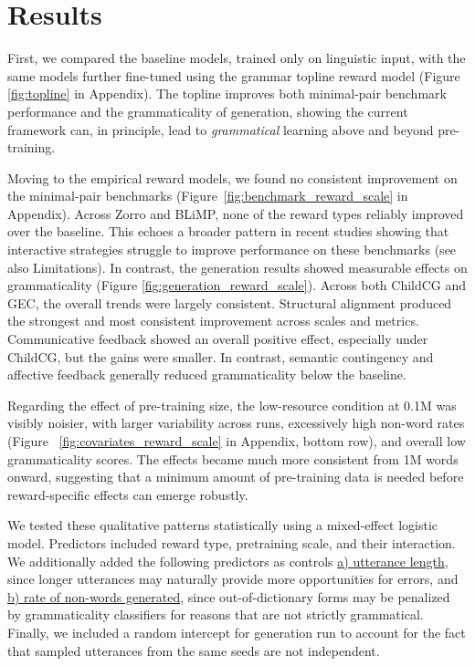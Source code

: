 \section{Results}
\label{sec:results}

First, we compared the baseline models, trained only on linguistic input, with the same models further fine-tuned using the grammar topline reward model (Figure \ref{fig:topline} in Appendix). The topline improves both minimal-pair benchmark performance and the grammaticality of generation, showing the current framework can, in principle, lead to \textit{grammatical} learning above and beyond pre-training. 

Moving to the empirical reward models, we found no consistent improvement on the minimal-pair benchmarks (Figure~\ref{fig:benchmark_reward_scale} in Appendix). Across Zorro and BLiMP, none of the reward types reliably improved over the baseline. This echoes a broader pattern in recent studies showing
that interactive strategies  struggle to improve performance on these benchmarks (see also Limitations). In contrast, the generation results showed measurable effects on grammaticality (Figure \ref{fig:generation_reward_scale}). Across both ChildCG and GEC, the overall trends were largely consistent. Structural alignment produced the strongest and most consistent improvement across scales and metrics. Communicative feedback showed an overall positive effect, especially under ChildCG, but the gains were smaller. In contrast, semantic contingency and affective feedback generally reduced grammaticality below the baseline. 

Regarding the effect of pre-training size, the low-resource condition at 0.1M was visibly noisier, with larger variability across runs, excessively high non-word rates (Figure ~\ref{fig:covariates_reward_scale} in Appendix, bottom row), and overall low grammaticality scores. The effects became much more consistent from 1M words onward,
suggesting that a minimum amount of pre-training data is needed before reward-specific effects can emerge robustly.

We tested these qualitative patterns statistically using a mixed-effect logistic model. Predictors included reward type, pretraining scale, and their interaction. We additionally added the following predictors as controls \uline{a) utterance length}, since longer utterances may naturally provide more opportunities for errors, and \uline{b) rate of non-words generated}, since out-of-dictionary forms may be penalized by grammaticality classifiers for reasons that are not strictly grammatical.  Finally, we included a random intercept for generation run to account for the fact that sampled utterances from the same seeds are not independent.


